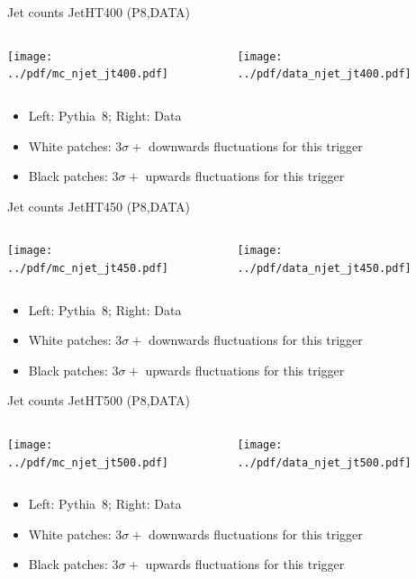 \documentclass[9pt]{beamer}
\begin{document}
\begin{frame}[t]{Jet counts JetHT400 (P8,DATA)}
\begin{columns}[T]
  \begin{column}{.5\textwidth}
  \texttt{[image: ../pdf/mc\_njet\_jt400.pdf]}
  \end{column}
  \begin{column}{.5\textwidth}
  \texttt{[image: ../pdf/data\_njet\_jt400.pdf]}
  \end{column}
\end{columns}
\begin{itemize}
 \item Left: Pythia~8; Right: Data
 \item White patches: $3\sigma+$ downwards fluctuations for this trigger
 \item Black patches: $3\sigma+$ upwards fluctuations for this trigger
\end{itemize}
\end{frame}

\begin{frame}[t]{Jet counts JetHT450 (P8,DATA)}
\begin{columns}[T]
  \begin{column}{.5\textwidth}
  \texttt{[image: ../pdf/mc\_njet\_jt450.pdf]}
  \end{column}
  \begin{column}{.5\textwidth}
  \texttt{[image: ../pdf/data\_njet\_jt450.pdf]}
  \end{column}
\end{columns}
\begin{itemize}
 \item Left: Pythia~8; Right: Data
 \item White patches: $3\sigma+$ downwards fluctuations for this trigger
 \item Black patches: $3\sigma+$ upwards fluctuations for this trigger
\end{itemize}
\end{frame}

\begin{frame}[t]{Jet counts JetHT500 (P8,DATA)}
\begin{columns}[T]
  \begin{column}{.5\textwidth}
  \texttt{[image: ../pdf/mc\_njet\_jt500.pdf]}
  \end{column}
  \begin{column}{.5\textwidth}
  \texttt{[image: ../pdf/data\_njet\_jt500.pdf]}
  \end{column}
\end{columns}
\begin{itemize}
 \item Left: Pythia~8; Right: Data
 \item White patches: $3\sigma+$ downwards fluctuations for this trigger
 \item Black patches: $3\sigma+$ upwards fluctuations for this trigger
\end{itemize}
\end{frame}
\end{document}
